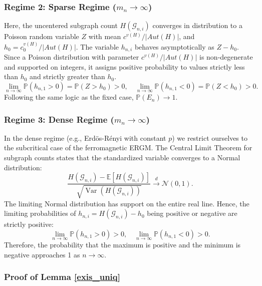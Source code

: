 \documentclass[12pt]{article}
\DeclareMathOperator{\Var}{Var}   %
\numberwithin{equation}{section}
\begin{document}
\subsubsection*{Regime 2: Sparse Regime ($m_n \to \infty$)}
Here, the uncentered subgraph count $H(\mathcal{G}_{n,i})$ converges in distribution to a Poisson random variable $Z$ with mean $c^{v(H)}/\lvert Aut(H)\rvert $, and $h_0 = c_0^{v(H)}/\lvert Aut(H)\rvert$. The variable $h_{n,i}$ behaves asymptotically as $Z - h_0$. Since a Poisson distribution with parameter $c^{v(H)}/\lvert Aut(H)\rvert $ is non-degenerate and supported on integers, it assigns positive probability to values strictly less than $h_0$ and strictly greater than $h_0$.
\[
\lim_{n \to \infty} \mathbb{P}(h_{n,1} > 0) = \mathbb{P}(Z > h_0) > 0, \quad \lim_{n \to \infty} \mathbb{P}(h_{n,1} < 0) = \mathbb{P}(Z < h_0) > 0.
\]
Following the same logic as the fixed case, $\mathbb{P}(E_n) \to 1$.

\subsubsection*{Regime 3: Dense Regime ($m_n \to \infty$)}
In the dense regime (e.g., Erd{\"o}s-R{\'e}nyi with constant $p$) we restrict ourselves to the subcritical case of the ferromagnetic ERGM. The Central Limit Theorem for subgraph counts states that the standardized variable converges to a Normal distribution:
\[
\frac{H(\mathcal{G}_{n,i})- \mathbb{E}[H(\mathcal{G}_{n,i})]}{\sqrt{\Var(H(\mathcal{G}_{n,i}))}} \xrightarrow{d} \mathcal{N}(0, 1).
\]
The limiting Normal distribution has support on the entire real line. Hence, the limiting probabilities of $h_{n,i} = H(\mathcal{G}_{n,i})-h_0$ being positive or negative are strictly positive:
\[
\lim_{n \to \infty} \mathbb{P}(h_{n,1} > 0) > 0, \quad \lim_{n \to \infty} \mathbb{P}(h_{n,1} < 0) > 0.
\]
Therefore, the probability that the maximum is positive and the minimum is negative approaches 1 as $n \to \infty$.

\subsubsection{Proof of Lemma \ref{exis_uniq}}
\end{document}
